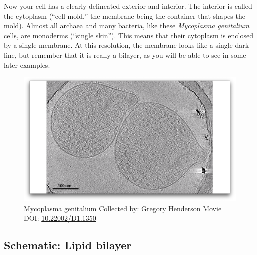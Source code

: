 \documentclass[]{tufte-book}
\begin{document}
Now your cell has a clearly delineated exterior and interior. The
interior is called the cytoplasm (``cell mold,'' the membrane being the
container that shapes the mold). Almost all archaea and many bacteria,
like these \emph{Mycoplasma genitalium} cells, are monoderms (``single
skin''). This means that their cytoplasm is enclosed by a single
membrane. At this resolution, the membrane looks like a single dark
line, but remember that it is really a bilayer, as you will be able to
see in some later examples.





\begin{figure}
\includegraphics{movie_stills/2_1} \caption[\protect\hyperlink{tree}{Mycoplasma genitalium} Collected by:
\protect\hyperlink{gregory_henderson}{Gregory Henderson} Movie DOI:
\href{https://doi.org/10.22002/D1.1350}{10.22002/D1.1350}]{\protect\hyperlink{tree}{Mycoplasma genitalium} Collected by:
\protect\hyperlink{gregory_henderson}{Gregory Henderson} Movie DOI:
\href{https://doi.org/10.22002/D1.1350}{10.22002/D1.1350}}\label{fig:2-1}
\end{figure}

\hypertarget{Lipid_bilayer}{\subsection*{Schematic: Lipid
bilayer}\label{Lipid_bilayer}}
\end{document}
